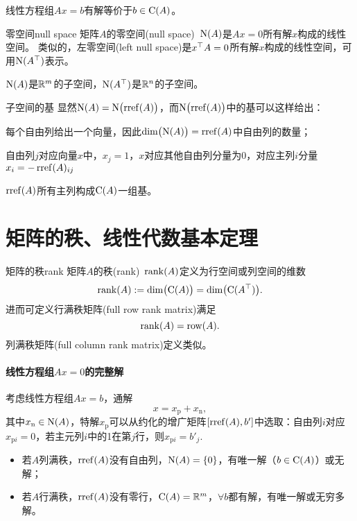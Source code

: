 线性方程组$Ax=b$有解等价于$b\in\operatorname{C}(A)$。
\begin{definition}{零空间}{null space}
	矩阵$A$的零空间(null space)~$\operatorname{N}(A)$是$Ax=0$所有解$x$构成的线性空间。
	\tcblower
	类似的，左零空间(left null space)是$x^\top A=0$所有解$x$构成的线性空间，可用$\operatorname{N}(A^\top)$表示。
\end{definition}
$\operatorname{N}(A)$是$\mathbb R^m$的子空间，$\operatorname{N}(A^\top)$是$\mathbb R^n$的子空间。
\begin{example}{子空间的基}{}
	显然$\operatorname{N}(A)=\operatorname{N}\bigl(\operatorname{rref}(A)\bigr)$，而$\operatorname{N}\bigl(\operatorname{rref}(A)\bigr)$中的基可以这样给出：
	\begin{compactitem}
		\item 每个自由列给出一个向量，因此$\dim\bigl(\operatorname{N}(A)\bigr)=\operatorname{rref}(A)$中自由列的数量；
		\item 自由列$j$对应向量$x$中，$x_j=1$，$x$对应其他自由列分量为0，对应主列$i$分量$x_i=-\operatorname{rref}(A)_{ij}$
	\end{compactitem}
	\tcblower
	$\operatorname{rref}(A)$所有主列构成$\operatorname{C}(A)$一组基。
\end{example}
\section{矩阵的秩、线性代数基本定理}
\begin{definition}{矩阵的秩}{rank}
	矩阵$A$的秩(rank)~$\operatorname{rank}(A)$定义为行空间或列空间的维数%
	\[
		\operatorname{rank}(A):=\dim\bigl(\operatorname{C}(A)\bigr)=\dim\bigl(\operatorname{C}(A^\top)\bigr).
	\]
	进而可定义行满秩矩阵(full row rank matrix)满足
	\[
		\operatorname{rank}(A)=\operatorname{row}(A).
	\]
	列满秩矩阵(full column rank matrix)定义类似。
\end{definition}
\paragraph{线性方程组$Ax=0$的完整解}考虑线性方程组$Ax=b$，通解
\[
	x=x_{\mathrm p}+x_{\mathrm n},
\]
其中$x_{\mathrm n}\in\operatorname{N}(A)$，特解$x_{\mathrm p}$可以从约化的增广矩阵$[\operatorname{rref}(A),b']$中选取：自由列$i$对应$x_{{\mathrm p}i}=0$，若主元列$i$中的1在第$j$行，则$x_{{\mathrm p}i}=b'_j.$
\begin{itemize}
	\item 若$A$列满秩，$\operatorname{rref}(A)$没有自由列，$\operatorname{N}(A)=\{0\}$，有唯一解（$b\in\operatorname{C}(A)$）或无解；
	\item 若$A$行满秩，$\operatorname{rref}(A)$没有零行，$\operatorname{C}(A)=\mathbb R^m$，$\forall b$都有解，有唯一解或无穷多解。
\end{itemize}
